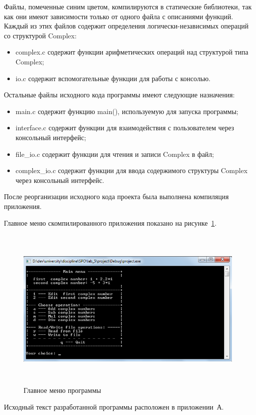 Файлы, помеченные синим цветом, компилируются в статические библиотеки,
так как они имеют зависимости только от одного файла с описаниями функций.
Каждый из этих файлов содержит определения логически-независимых операций со 
структурой Complex:

\begin{itemize}
  \item complex.c содержит функции арифметических операций над структурой типа Complex;
  \item io.c содержит вспомогательные функции для работы с консолью.
\end{itemize} 

Остальные файлы исходного кода программы имеют следующие назначения:
\begin{itemize}
  \item main.c содержит функцию main(), используемую для запуска программы;
  \item interface.c содержит функции для взаимодействия с пользователем через
    консольный интерфейс;
  \item file\_io.c содержит функции для чтения и записи Complex в файл;
  \item complex\_io.c содержит функции для ввода содержимого структуры Complex
    через консольный интерфейс.
\end{itemize}

После реорганизации исходного кода проекта была выполнена компиляция приложения.

Главное меню скомпилированного приложения показано на рисунке~\ref{fig:main_menu}.

\begin{figure}[htbp]
  \centering
  \includegraphics[width=150mm,height=80mm]{img/main_menu}
  \caption{Главное меню программы}\label{fig:main_menu}
\end{figure}

Исходный текст разработанной программы расположен в приложении~А.

\newpage